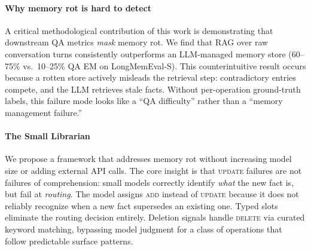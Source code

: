 \documentclass[10pt, twocolumn]{article}
\begin{document}
\paragraph{Why memory rot is hard to detect}
A critical methodological contribution of this work is demonstrating that
downstream QA metrics \emph{mask} memory rot.
We find that RAG over raw conversation turns consistently outperforms an
LLM-managed memory store (60--75\% vs.\ 10--25\% QA EM on LongMemEval-S).
This counterintuitive result occurs because a rotten store actively
misleads the retrieval step: contradictory entries compete, and the LLM
retrieves stale facts.
Without per-operation ground-truth labels, this failure mode looks like a
``QA difficulty'' rather than a ``memory management failure.''

\paragraph{The Small Librarian}
We propose a framework that addresses memory rot without increasing model
size or adding external API calls.
The core insight is that \textsc{update} failures are not failures of
comprehension: small models correctly identify \emph{what} the new fact
is, but fail at \emph{routing}. The model assigns \textsc{add} instead
of \textsc{update} because it does not reliably recognize when a new fact
supersedes an existing one.
Typed slots eliminate the routing decision entirely.
Deletion signals handle \textsc{delete} via curated keyword matching,
bypassing model judgment for a class of operations that follow predictable
surface patterns.
\end{document}
